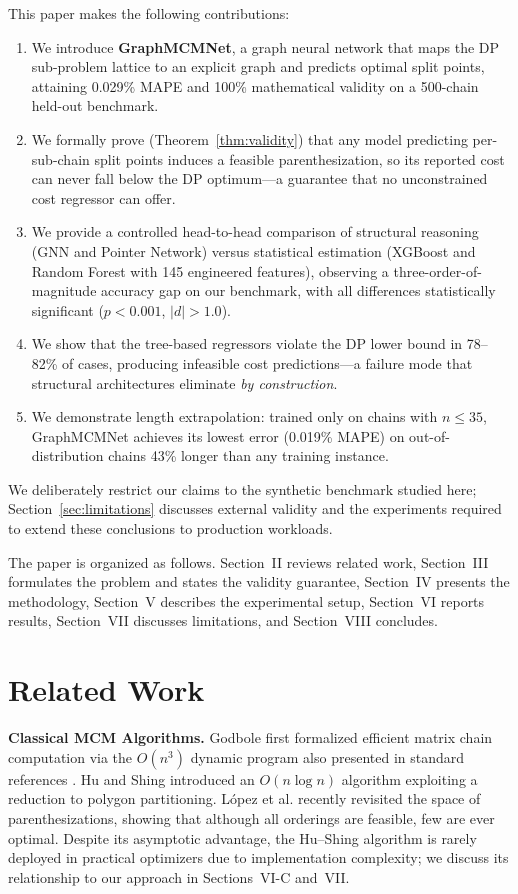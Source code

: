 \documentclass[conference]{IEEEtran}
\begin{document}
This paper makes the following contributions:
\begin{enumerate}
    \item We introduce \textbf{GraphMCMNet}, a graph neural network that maps
    the DP sub-problem lattice to an explicit graph and predicts optimal split
    points, attaining 0.029\% MAPE and 100\% mathematical validity on a
    500-chain held-out benchmark.
    \item We formally prove (Theorem~\ref{thm:validity}) that any model
    predicting per-sub-chain split points induces a feasible parenthesization,
    so its reported cost can never fall below the DP optimum---a guarantee that
    no unconstrained cost regressor can offer.
    \item We provide a controlled head-to-head comparison of structural
    reasoning (GNN and Pointer Network) versus statistical estimation (XGBoost
    and Random Forest with 145 engineered features), observing a
    three-order-of-magnitude accuracy gap on our benchmark, with all
    differences statistically significant ($p{<}0.001$, $|d|{>}1.0$).
    \item We show that the tree-based regressors violate the DP lower bound in
    78--82\% of cases, producing infeasible cost predictions---a failure mode
    that structural architectures eliminate \emph{by construction}.
    \item We demonstrate length extrapolation: trained only on chains with
    $n{\le}35$, GraphMCMNet achieves its lowest error (0.019\% MAPE) on
    out-of-distribution chains 43\% longer than any training instance.
\end{enumerate}

We deliberately restrict our claims to the synthetic benchmark studied here;
Section~\ref{sec:limitations} discusses external validity and the experiments
required to extend these conclusions to production workloads.

The paper is organized as follows. Section~II reviews related work,
Section~III formulates the problem and states the validity guarantee,
Section~IV presents the methodology, Section~V describes the experimental
setup, Section~VI reports results, Section~VII discusses limitations, and
Section~VIII concludes.

\section{Related Work}

\textbf{Classical MCM Algorithms.} Godbole \cite{godbole1973} first formalized
efficient matrix chain computation via the $O(n^3)$ dynamic program also
presented in standard references \cite{cormen2009}. Hu and Shing
\cite{hushing1982} introduced an $O(n \log n)$ algorithm exploiting a reduction
to polygon partitioning. L\'opez et al. \cite{lopez2023} recently revisited the
space of parenthesizations, showing that although all orderings are feasible,
few are ever optimal. Despite its asymptotic advantage, the Hu--Shing algorithm
is rarely deployed in practical optimizers due to implementation complexity; we
discuss its relationship to our approach in Sections~VI-C and~VII.
\end{document}
